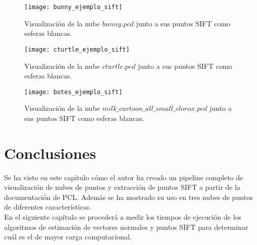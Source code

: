 \begin{figure}[!htb]
  \texttt{[image: bunny\_ejemplo\_sift]}
  \caption{Visualización de la nube $bunny.pcd$ junto a sus puntos SIFT como esferas blancas.}\label{fig:bunny_ejemplo_sift}
\endminipage\hfill
{}
  \texttt{[image: cturtle\_ejemplo\_sift]}
  \caption{Visualización de la nube $cturtle.pcd$ junto a sus puntos SIFT como esferas blancas.}\label{fig:cturtle_ejemplo_sift}
\endminipage\hfill
{}
  \texttt{[image: botes\_ejemplo\_sift]}
  \caption{Visualización de la nube $milk\_cartoon\_all\_small\_clorox.pcd$ junto a sus puntos SIFT como esferas blancas.}\label{fig:botes_ejemplo_sift}
\endminipage\hfill
\end{figure}


\section{Conclusiones}
Se ha visto en este capítulo cómo el autor ha creado un pipeline completo de visualización de nubes de puntos y extracción de puntos SIFT a partir de la documentación de PCL. Además se ha mostrado su uso en tres nubes de puntos de diferentes características.
\\
En el siguiente capítulo se procederá a medir los tiempos de ejecución de los algoritmos de estimación de vectores normales y puntos SIFT para determinar cuál es el de mayor carga computacional.
